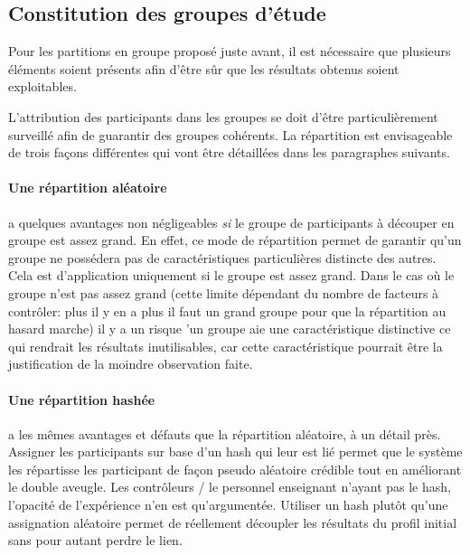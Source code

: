 \documentclass[a4paper]{report}
\begin{document}
\subsection{Constitution des groupes d'étude}
Pour les partitions en groupe proposé juste avant, il est nécessaire que plusieurs éléments soient présents afin d'être sûr que les résultats obtenus soient exploitables.

L'attribution des participants dans les groupes se doit d'être particulièrement surveillé afin de guarantir des groupes cohérents.
La répartition est envisageable de trois façons différentes qui vont être détaillées dans les paragraphes suivants.

\paragraph{Une répartition aléatoire} a quelques avantages non négligeables \textit{si} le groupe de participants à découper en groupe est assez grand.
En effet, ce mode de répartition permet de garantir qu'un groupe ne possédera pas de caractéristiques particulières distincte des autres.
Cela est d'application uniquement si le groupe est assez grand.
Dans le cas où le groupe n'est pas assez grand (cette limite dépendant du nombre de facteurs à contrôler: plus il y en a plus il faut un grand groupe pour que la répartition au hasard marche) il y a un risque 'un groupe aie une caractéristique distinctive ce qui rendrait les résultats inutilisables, car cette caractéristique pourrait être la justification de la moindre observation faite.

\paragraph{Une répartition hashée} a les mêmes avantages et défauts que la répartition aléatoire, à un détail près.
Assigner les participants sur base d'un hash qui leur est lié permet que le système les répartisse les participant de façon pseudo aléatoire crédible tout en améliorant le double aveugle.
Les contrôleurs / le personnel enseignant n'ayant pas le hash, l'opacité de l'expérience n'en est qu'argumentée.
Utiliser un hash plutôt qu'une assignation aléatoire permet de réellement découpler les résultats du profil initial sans pour autant perdre le lien.
\end{document}
